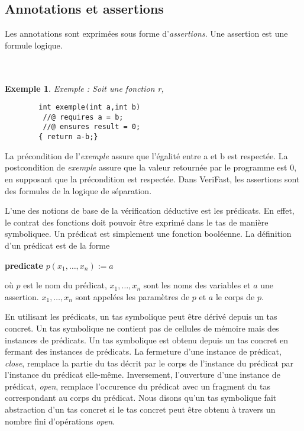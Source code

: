\documentclass[11pt,openany]{article}
\newcommand{\verifast}{VeriFast}
\newtheorem{exemple}{Exemple}
\begin{document}
	\subsection{Annotations et assertions}
		 Les annotations sont exprim\'ees sous forme d'\textit{assertions}. Une assertion est une formule logique. \\ \\ \\
		 
		\begin{exemple}
		Exemple : Soit une fonction r,
		\begin{lstlisting}
		int exemple(int a,int b)
		 //@ requires a = b;
		 //@ ensures result = 0;
		{ return a-b;}
		\end{lstlisting}
		\end{exemple}
		
	
		La pr\'econdition de l'\textit{exemple} assure que l'\'egalit\'e entre a et b est respect\'ee. La postcondition de \textit{exemple} assure que la valeur retourn\'ee par le programme est 0, en supposant que la pr\'econdition est respect\'ee. Dans \verifast, les assertions sont des formules de la logique de s\'eparation.
	
	L'une des notions de base de la v\'erification d\'eductive est les pr\'edicats. En effet, le contrat des fonctions doit pouvoir \^etre exprim\'e dans le tas de mani\`ere symboliquee. Un pr\'edicat est simplement une fonction bool\'eenne. La d\'efinition d'un pr\'edicat est de la forme
	\begin{center}
	
		\textbf{predicate} $p(x_1,\ldots,x_n):=a$

	\end{center}
o\`u $p$ est le nom du pr\'edicat, $x_1,\ldots,x_n$ sont les noms des variables et $a$ une assertion. $x_1,\ldots,x_n$ sont appel\'ees les param\`etres de $p$ et $a$ le corps de $p$.


	En utilisant les pr\'edicats, un tas symbolique peut \^etre d\'eriv\'e depuis un tas concret. Un tas symbolique ne contient pas de cellules de m\'emoire mais des instances de pr\'edicats. Un tas symbolique est obtenu depuis un tas concret en fermant des instances de pr\'edicats. La fermeture d'une instance de pr\'edicat, \textit{close}, remplace la partie du tas d\'ecrit par le corps de l'instance du pr\'edicat par l'instance du pr\'edicat elle-m\^eme. Inversement, l'ouverture d'une instance de pr\'edicat, \textit{open}, remplace l'occurence du pr\'edicat avec un fragment du tas correspondant au corps du pr\'edicat. Nous disons qu'un tas symbolique fait abstraction d'un tas concret si le tas concret peut \^etre obtenu \`a travers un nombre fini d'op\'erations \textit{open}.
	
\end{document}
